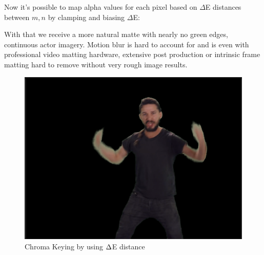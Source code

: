 Now it's possible to map alpha values for each pixel based on $\Delta$E 
distances between $m, n$ by clamping and biasing $\Delta$E:




With that we receive a more natural matte with nearly no green edges, 
continuous actor imagery. Motion blur is hard to account for and is even with 
professional video matting hardware, extensive post production or intrinsic 
frame matting hard to remove without very rough image results.

\begin{figure}[htb]
	\includegraphics[width=\textwidth]{_raw_resources/Comparison_DeltaE_color.png}
	\caption{Chroma Keying by using $\protect\Delta $E distance}
	\label{fig:chroma:euclidean:rgb}
\end{figure}


